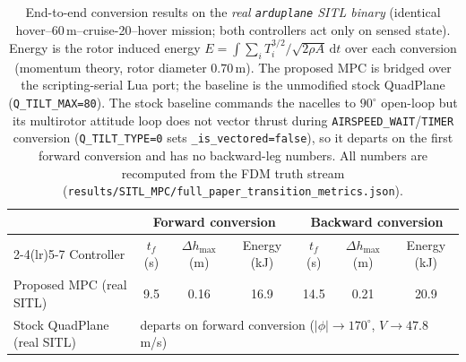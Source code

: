 \documentclass[preprint,3p,11pt]{elsarticle}
\begin{document}
\begin{table}[t]
\centering
\caption{End-to-end conversion results on the \emph{real \texttt{arduplane}
SITL binary} (identical hover--60\,m--cruise-20--hover mission; both controllers
act only on sensed state). Energy is the rotor induced energy
$E=\int\sum_i T_i^{3/2}/\sqrt{2\rho A}\,\mathrm dt$ over each conversion
(momentum theory, rotor diameter $0.70$\,m). The proposed MPC is bridged over
the scripting-serial Lua port; the baseline is the unmodified stock QuadPlane
(\texttt{Q\_TILT\_MAX=80}). The stock baseline commands the nacelles to
$90^\circ$ open-loop but its multirotor attitude loop does not vector thrust
during \texttt{AIRSPEED\_WAIT}/\texttt{TIMER} conversion
(\texttt{Q\_TILT\_TYPE=0} sets \texttt{\_is\_vectored=false}), so it departs on
the first forward conversion and has no backward-leg numbers. All numbers are
recomputed from the FDM truth stream
(\texttt{results/SITL\_MPC/full\_paper\_transition\_metrics.json}).}
\label{tab:main}
\small
\begin{tabular}{lcccccc}
\toprule
 & \multicolumn{3}{c}{Forward conversion} & \multicolumn{3}{c}{Backward conversion} \\
\cmidrule(lr){2-4}\cmidrule(lr){5-7}
Controller & $t_f$ (s) & $\Delta h_{\max}$ (m) & Energy (kJ) & $t_f$ (s) & $\Delta h_{\max}$ (m) & Energy (kJ) \\
\midrule
Proposed MPC (real SITL) & 9.5 & 0.16 & 16.9 & 14.5 & 0.21 & 20.9 \\
Stock QuadPlane (real SITL) & \multicolumn{6}{l}{departs on forward conversion ($|\phi|\to170^\circ$, $V\to47.8$ m/s)} \\
\bottomrule
\end{tabular}
\end{table}
\end{document}
